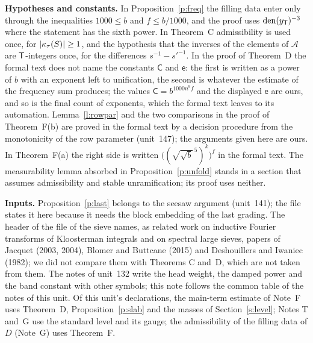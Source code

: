 \documentclass[11pt,a4paper]{article}
\newcommand{\subhead}[1]{\par\addvspace{9pt plus 2pt}\Needspace{4\baselineskip}\noindent\textbf{#1}\enspace\ignorespaces}
\theoremstyle{plainx}
\theoremstyle{uprightx}
\begin{document}
\subhead{Hypotheses and constants.} In Proposition~\ref{p:freq} the filling data enter only through the inequalities
$1000\le b$ and $f\le b/1000$, and the proof uses $\operatorname{den}(y_{\mathsf{T}})^{-3}$ where the statement has the sixth power. In
Theorem~C admissibility is used once, for $|\kappa_{\tau}(S)|\ge1$, and the hypothesis that the inverses of the elements
of $\mathcal{A}$ are $\mathsf{T}$-integers once, for the differences $s^{-1}-s'^{-1}$. In the proof of Theorem~D the formal
text does not name the constants $\mathsf{C}$ and $\mathsf{e}$: the first is written as a power of $b$ with an exponent
left to unification, the second is whatever the estimate of the frequency sum produces; the values
$\mathsf{C}=b^{1000n^{9}f}$ and the displayed $\mathsf{e}$ are ours, and so is the final count of exponents, which the
formal text leaves to its automation. Lemma~\ref{l:rowpar} and the two comparisons in the proof of Theorem~F(b) are
proved in the formal text by a decision procedure from the monotonicity of the row parameter (unit~147); the
arguments given here are ours. In Theorem~F(a) the right side is written
$\bigl((\sqrt{\sqrt{b}}^{\,5})^{k}\bigr)^{f}$ in the formal text. The measurability lemma absorbed in
Proposition~\ref{p:unfold} stands in a section that assumes admissibility and stable unramification; its proof uses
neither.

\subhead{Inputs.} Proposition~\ref{p:last} belongs to the seesaw argument (unit~141); the file states it here
because it needs the block embedding of the last grading. The header of the file of the sieve names, as related
work on inductive Fourier transforms of Kloosterman integrals and on spectral large sieves, papers of Jacquet
(2003, 2004), Blomer and Buttcane (2015) and Deshouillers and Iwaniec (1982); we did not compare them with
Theorems C and~D, which are not taken from them. The notes of unit~132 write the head weight, the damped power and
the band constant with other symbols; this note follows the common table of the notes of this unit. Of this unit's declarations, the main-term estimate of Note~F uses Theorem~D,
Proposition~\ref{p:slab} and the masses of Section~\ref{s:level}; Notes T and~G use the standard level and its
gauge; the admissibility of the filling data of $D$ (Note~G) uses Theorem~F.
\end{document}
